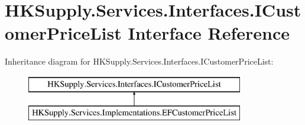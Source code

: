 \hypertarget{interface_h_k_supply_1_1_services_1_1_interfaces_1_1_i_customer_price_list}{}\section{H\+K\+Supply.\+Services.\+Interfaces.\+I\+Customer\+Price\+List Interface Reference}
\label{interface_h_k_supply_1_1_services_1_1_interfaces_1_1_i_customer_price_list}
Inheritance diagram for H\+K\+Supply.\+Services.\+Interfaces.\+I\+Customer\+Price\+List\+:\begin{figure}[H]
\begin{center}
\leavevmode
\includegraphics[height=2.000000cm]{interface_h_k_supply_1_1_services_1_1_interfaces_1_1_i_customer_price_list}
\end{center}
\end{figure}
